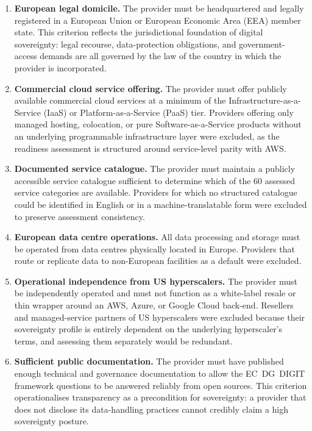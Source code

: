 \begin{enumerate}
  \item \textbf{European legal domicile.} The provider must be headquartered and legally registered in a European Union or European Economic Area (EEA) member state. This criterion reflects the jurisdictional foundation of digital sovereignty: legal recourse, data-protection obligations, and government-access demands are all governed by the law of the country in which the provider is incorporated.

  \item \textbf{Commercial cloud service offering.} The provider must offer publicly available commercial cloud services at a minimum of the Infrastructure-as-a-Service (IaaS) or Platform-as-a-Service (PaaS) tier. Providers offering only managed hosting, colocation, or pure Software-as-a-Service products without an underlying programmable infrastructure layer were excluded, as the readiness assessment is structured around service-level parity with AWS.

  \item \textbf{Documented service catalogue.} The provider must maintain a publicly accessible service catalogue sufficient to determine which of the 60 assessed service categories are available. Providers for which no structured catalogue could be identified in English or in a machine-translatable form were excluded to preserve assessment consistency.

  \item \textbf{European data centre operations.} All data processing and storage must be operated from data centres physically located in Europe. Providers that route or replicate data to non-European facilities as a default were excluded.

  \item \textbf{Operational independence from US hyperscalers.} The provider must be independently operated and must not function as a white-label resale or thin wrapper around an AWS, Azure, or Google Cloud back-end. Resellers and managed-service partners of US hyperscalers were excluded because their sovereignty profile is entirely dependent on the underlying hyperscaler's terms, and assessing them separately would be redundant.

  \item \textbf{Sufficient public documentation.} The provider must have published enough technical and governance documentation to allow the EC~DG~DIGIT framework questions to be answered reliably from open sources. This criterion operationalises transparency as a precondition for sovereignty: a provider that does not disclose its data-handling practices cannot credibly claim a high sovereignty posture.
\end{enumerate}

